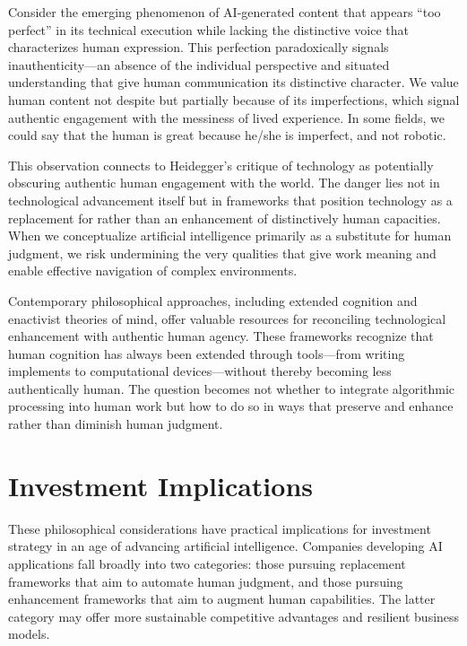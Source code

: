 \documentclass[
  Letterpaper,
]{scrbook}
\begin{document}
Consider the emerging phenomenon of AI-generated content that appears
``too perfect'' in its technical execution while lacking the distinctive
voice that characterizes human expression. This perfection paradoxically
signals inauthenticity---an absence of the individual perspective and
situated understanding that give human communication its distinctive
character. We value human content not despite but partially because of
its imperfections, which signal authentic engagement with the messiness
of lived experience. In some fields, we could say that the human is
great because he/she is imperfect, and not robotic.

This observation connects to Heidegger's critique of technology as
potentially obscuring authentic human engagement with the world. The
danger lies not in technological advancement itself but in frameworks
that position technology as a replacement for rather than an enhancement
of distinctively human capacities. When we conceptualize artificial
intelligence primarily as a substitute for human judgment, we risk
undermining the very qualities that give work meaning and enable
effective navigation of complex environments.

Contemporary philosophical approaches, including extended cognition and
enactivist theories of mind, offer valuable resources for reconciling
technological enhancement with authentic human agency. These frameworks
recognize that human cognition has always been extended through
tools---from writing implements to computational devices---without
thereby becoming less authentically human. The question becomes not
whether to integrate algorithmic processing into human work but how to
do so in ways that preserve and enhance rather than diminish human
judgment.

\section{Investment Implications}\label{investment-implications-2}

These philosophical considerations have practical implications for
investment strategy in an age of advancing artificial intelligence.
Companies developing AI applications fall broadly into two categories:
those pursuing replacement frameworks that aim to automate human
judgment, and those pursuing enhancement frameworks that aim to augment
human capabilities. The latter category may offer more sustainable
competitive advantages and resilient business models.
\end{document}
